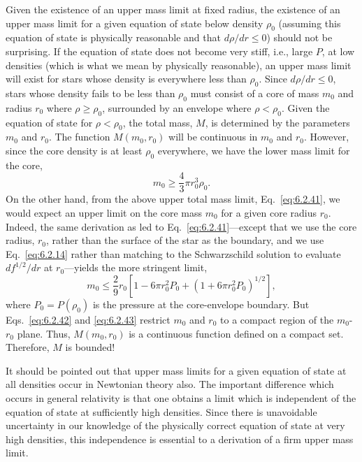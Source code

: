 Given the existence of an upper mass limit at fixed radius, the existence of an
upper mass limit for a given equation of state below density \(\rho_0\) (assuming
this equation of state is physically reasonable and that \(d\rho/dr\leq0\))
should not be surprising. If the equation of state does not become very stiff,
i.e., large \(P\), at low densities (which is what we mean by physically
reasonable), an upper mass limit will exist for stars whose density is everywhere
less than \(\rho_0\). Since \(d\rho/dr\leq0\), stars whose density fails to be
less than \(\rho_0\) must consist of a core of mass \(m_0\) and radius \(r_0\)
where \(\rho\geq\rho_0\), surrounded by an envelope where \(\rho<\rho_0\). Given
the equation of state for \(\rho<\rho_0\), the total mass, \(M\), is determined by
the parameters \(m_0\) and \(r_0\). The function \(M(m_0,r_0)\) will be continuous
in \(m_0\) and \(r_0\). However, since the core density is at least \(\rho_0\)
everywhere, we have the lower mass limit for the core,
\begin{equation}
  m_0\geq\frac43\pi r_0^3\rho_0.
  \tag{6.2.42}\label{eq:6.2.42}
\end{equation}
On the other hand, from the above upper total mass limit,
Eq.~\eqref{eq:6.2.41}, we would expect an upper limit on the core mass \(m_0\)
for a given core radius \(r_0\). Indeed, the same derivation as led to
Eq.~\eqref{eq:6.2.41}---except that we use the core radius, \(r_0\), rather than
the surface of the star as the boundary, and we use Eq.~\eqref{eq:6.2.14} rather
than matching to the Schwarzschild solution to evaluate \(df^{1/2}/dr\) at
\(r_0\)---yields the more stringent limit,
\begin{equation}
  m_0\leq\frac29r_0\left[1-6\pi r_0^2P_0+
      (1+6\pi r_0^2P_0)^{1/2}\right],
  \tag{6.2.43}\label{eq:6.2.43}
\end{equation}
where \(P_0=P(\rho_0)\) is the pressure at the core-envelope boundary. But
Eqs.~\eqref{eq:6.2.42} and \eqref{eq:6.2.43} restrict \(m_0\) and \(r_0\) to a
compact region of the \(m_0\)-\(r_0\) plane. Thus, \(M(m_0,r_0)\) is a continuous
function defined on a compact set. Therefore, \(M\) is bounded!

It should be pointed out that upper mass limits for a given equation of state at
all densities occur in Newtonian theory also. The important difference which
occurs in general relativity is that one obtains a limit which is independent of
the equation of state at sufficiently high densities. Since there is unavoidable
uncertainty in our knowledge of the physically correct equation of state at very
high densities, this independence is essential to a derivation of a firm upper mass
limit.

